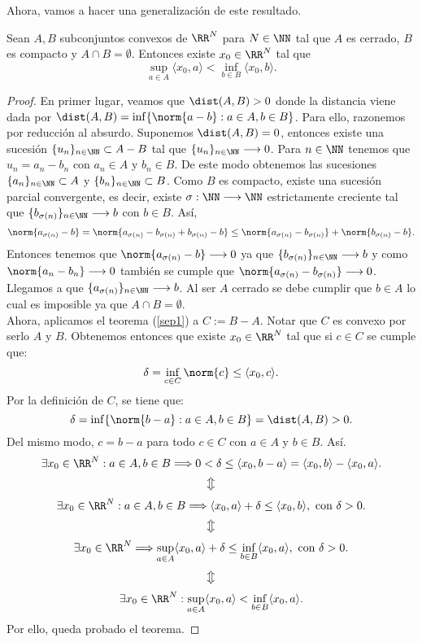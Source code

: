Ahora, vamos a hacer una generalización de este resultado.
\begin{teoremaBox}\label{separacion1}
Sean $ A,B $ subconjuntos convexos de $ \RR^N $ para $ N \in \NN $ tal que $ A $ es cerrado, $ B $ es compacto y $ A \cap B = \emptyset$. Entonces existe $ x_0 \in \RR^N $ tal que
\[
\sup_{a \in A} \langle x_0,a\rangle < \inf_{b\in B} \langle x_0,b\rangle.
\]
\end{teoremaBox}
\begin{proof}
En primer lugar, veamos que $ \dist(A,B) > 0 $ donde la distancia viene dada por $\dist(A,B) = \inf\{ \norm{a-b} : a\in A, b\in B\}$. Para ello, razonemos por reducción al absurdo. Suponemos $ \dist(A,B) = 0 $, entonces existe una sucesión $ \{u_n\}_{n\in\NN} \subset A-B $ tal que $ \{u_n\}_{n\in\NN} \longrightarrow 0 $. Para $ n\in\NN $ tenemos que $ u_n = a_n - b_n $ con $ a_n \in A $ y $ b_n \in B $. De este modo obtenemos las sucesiones $ \{a_n\}_{n\in\NN} \subset A $ y $ \{b_n\}_{n\in\NN} \subset B $. Como $ B $ es compacto, existe una sucesión parcial convergente, es decir, existe $ \sigma: \NN \longrightarrow \NN $ estrictamente creciente tal que $ \{b_{\sigma(n)}\}_{n\in\NN} \longrightarrow b$ con $ b \in B $. Así,
\[
\norm{a_{\sigma(n)}-b} = \norm{a_{\sigma(n)} - b_{\sigma(n)} + b_{\sigma(n)} - b} \leq  \norm{a_{\sigma(n)} - b_{\sigma(n)}} + \norm{b_{\sigma(n)} - b}.
\]
Entonces tenemos que $ \norm{a_{\sigma(n)}-b} \longrightarrow 0 $ ya que $ \{b_{\sigma(n)}\}_{n\in\NN} \longrightarrow b$ y como $ \norm{a_n - b_n}\longrightarrow 0$ también se cumple que $ \norm{a_{\sigma(n)} - b_{\sigma(n)}}\longrightarrow 0$. Llegamos a que $ \{a_{\sigma(n)}\}_{n\in\NN} \longrightarrow b$. Al ser $ A $ cerrado se debe cumplir que $ b \in A $ lo cual es imposible ya que $ A \cap B = \emptyset$. \\

Ahora, aplicamos el teorema (\ref{sep1}) a $ C:= B-A $. Notar que $ C $ es convexo por serlo $ A $ y $ B $. Obtenemos entonces que existe $ x_0 \in \RR^N $ tal que si $ c \in C $ se cumple que:
\[
\delta = \inf_{c \in C} \norm{c} \leq \langle x_0, c\rangle.
\]
Por la definición de $ C $, se tiene que:
\[
\delta = \inf\{ \norm{b-a} : a\in A, b\in B\} = \dist(A,B) > 0.
\] 
Del mismo modo, $ c = b-a $ para todo $ c \in C $ con $ a \in A $ y $ b \in B $. Así.
\[
\exists x_0 \in \RR^N: a\in A, b\in B \Longrightarrow 0 <\delta \leq \langle x_0, b-a\rangle = \langle x_0, b\rangle - \langle x_0,a\rangle.
\]
\[
\big\Updownarrow
\]
\[
\exists x_0 \in \RR^N: a\in A, b\in B \Longrightarrow \langle x_0, a\rangle + \delta \leq \langle x_0, b\rangle ,\text{ con } \delta > 0.
\]
\[
\big\Updownarrow
\]
\[
\exists x_0 \in \RR^N \Longrightarrow \sup_{a\in A}\langle x_0, a\rangle + \delta \leq \inf_{b \in B}\langle x_0, a\rangle, \text{ con } \delta > 0.
\]
\[
\big\Updownarrow
\]
\[
\exists x_0 \in \RR^N : \sup_{a\in A}\langle x_0, a\rangle < \inf_{b \in B}\langle x_0, a\rangle.
\]
Por ello, queda probado el teorema.
\end{proof}

